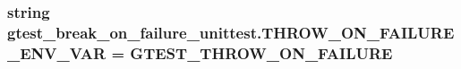 \subsubsection[{\texorpdfstring{T\+H\+R\+O\+W\+\_\+\+O\+N\+\_\+\+F\+A\+I\+L\+U\+R\+E\+\_\+\+E\+N\+V\+\_\+\+V\+AR}{THROW_ON_FAILURE_ENV_VAR}}]{\setlength{\rightskip}{0pt plus 5cm}string gtest\+\_\+break\+\_\+on\+\_\+failure\+\_\+unittest.\+T\+H\+R\+O\+W\+\_\+\+O\+N\+\_\+\+F\+A\+I\+L\+U\+R\+E\+\_\+\+E\+N\+V\+\_\+\+V\+AR = \textquotesingle{}G\+T\+E\+S\+T\+\_\+\+T\+H\+R\+O\+W\+\_\+\+O\+N\+\_\+\+F\+A\+I\+L\+U\+RE\textquotesingle{}}\hypertarget{namespacegtest__break__on__failure__unittest_ac5edd000e7dc4212c8c7ce947ebd3b72}{}\label{namespacegtest__break__on__failure__unittest_ac5edd000e7dc4212c8c7ce947ebd3b72}
